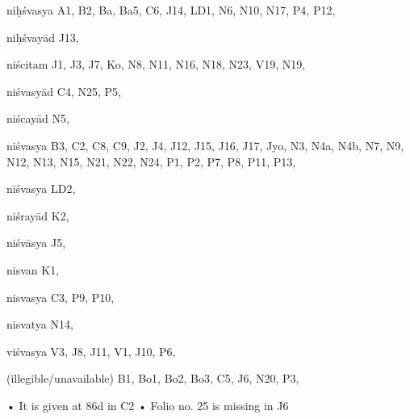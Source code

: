   \begin{marma}[hp03_056]


\item[niḥśvasya] A1, B2, Ba, Ba5, C6, J14, LD1, N6, N10, N17, P4, P12,
\item[niḥśvayād] J13,
\item[niścitam] J1, J3, J7, Ko, N8, N11, N16, N18, N23, V19, N19, 
\item[niśvasyād] C4, N25, P5, 
\item[niścayād] N5,
\item[niśvasya] B3, C2, C8, C9, J2, J4, J12, J15, J16, J17, Jyo, N3, N4a, N4b, N7, N9, N12, N13, N15, N21, N22, N24, P1, P2, P7, P8, P11, P13, 
\item[nīśvasya] LD2,
\item[niśrayād] K2,
\item[niśvāsya] J5,
\item[nisvan] K1,
\item[nisvasya] C3, P9, P10, 
\item[nisvatya] N14,
\item[viśvasya] V3, J8, J11, V1, J10, P6, 
\item[(illegible/unavailable)] B1, Bo1, Bo2, Bo3, C5, J6, N20, P3,

  \begin{description}
    • It is given at 86d in C2
    • Folio no. 25 is missing in J6
    \end{description}

\end{marma}

